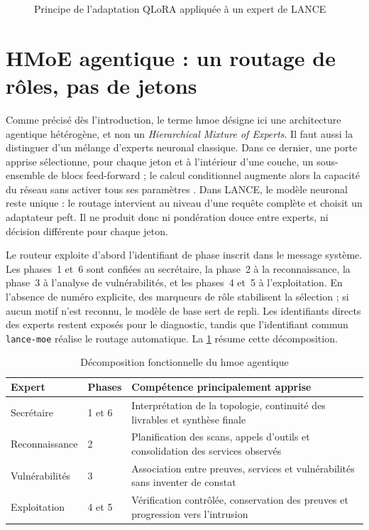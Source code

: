 \begin{figure}[htbp]
  \centering
  \resizebox{0.98\textwidth}{!}{}
  \caption{Principe de l'adaptation QLoRA appliquée à un expert de LANCE}
  \label{fig:fonctionnement-qlora}
\end{figure}

\section{HMoE agentique : un routage de rôles, pas de jetons}
\label{sec:hmoe-routage}

Comme précisé dès l'introduction, le terme \gls{hmoe} désigne ici une
architecture agentique hétérogène, et non un \emph{Hierarchical Mixture of
Experts}. Il faut aussi la distinguer d'un mélange d'experts neuronal classique.
Dans ce dernier, une porte apprise sélectionne, pour chaque jeton et à
l'intérieur d'une couche, un sous-ensemble de blocs feed-forward ; le calcul
conditionnel augmente alors la capacité du réseau sans activer tous ses
paramètres \cite{shazeer2017moe}. Dans LANCE, le modèle neuronal reste unique :
le routage intervient au niveau d'une requête complète et choisit un adaptateur
\gls{peft}. Il ne produit donc ni pondération douce entre experts, ni décision
différente pour chaque jeton.

Le routeur exploite d'abord l'identifiant de phase inscrit dans le message
système. Les phases~1 et~6 sont confiées au secrétaire, la phase~2 à la
reconnaissance, la phase~3 à l'analyse de vulnérabilités, et les phases~4 et~5 à
l'exploitation. En l'absence de numéro explicite, des marqueurs de rôle
stabilisent la sélection ; si aucun motif n'est reconnu, le modèle de base sert
de repli. Les identifiants directs des experts restent exposés pour le
diagnostic, tandis que l'identifiant commun \texttt{\footnotesize lance-moe} réalise le
routage automatique. La \cref{tab:hmoe-experts} résume cette décomposition.

\begin{table}[H]
  \centering
  \caption{Décomposition fonctionnelle du \gls{hmoe} agentique}
  \label{tab:hmoe-experts}
  \begin{tabular}{lp{}p{}}
    \toprule
    Expert & Phases & Compétence principalement apprise \\
    \midrule
    Secrétaire & 1 et 6 & Interprétation de la topologie, continuité des livrables et synthèse finale \\
    Reconnaissance & 2 & Planification des scans, appels d'outils et consolidation des services observés \\
    Vulnérabilités & 3 & Association entre preuves, services et vulnérabilités sans inventer de constat \\
    Exploitation & 4 et 5 & Vérification contrôlée, conservation des preuves et progression vers l'intrusion \\
    \bottomrule
  \end{tabular}
\end{table}

